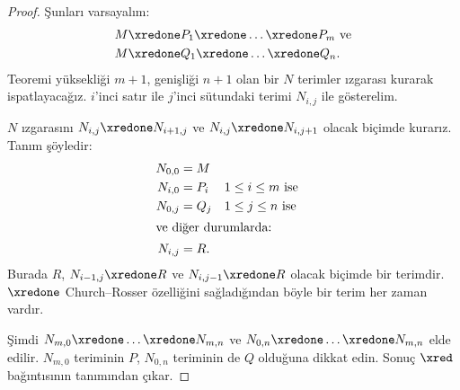 \begin{proof}
  Şunları varsayalım:
  \begin{align*}
    M & \xredone P_1 \xredone \dots \xredone P_m \text{ ve}\\
    M & \xredone Q_1 \xredone \dots \xredone Q_n.
  \end{align*}
  Teoremi yüksekliği $m+1$, genişliği $n+1$ olan bir $N$ terimler ızgarası
  kurarak ispatlayacağız. $i$'inci satır ile $j$'inci sütundaki terimi
  $N_{i,j}$ ile gösterelim.

  $N$ ızgarasını $N_{i,j}\xredone N_{i+1,j}$ ve
  $N_{i,j}\xredone N_{i,j+1}$ olacak biçimde kurarız. Tanım şöyledir:
  \begin{align*}
    N_{0,0} &= M \\
    N_{i,0} &= P_i && \text{$1\le i\le m$ ise} \\
    N_{0,j} &= Q_j && \text{$1\le j\le n$ ise} \\
  \intertext{ve diğer durumlarda:}
    N_{i,j} &= R.
  \end{align*}
  Burada $R$, $N_{i-1,j}\xredone R$ ve $N_{i,j-1}\xredone R$ olacak
  biçimde bir terimdir. $\xredone$ Church--Rosser özelliğini sağladığından
  böyle bir terim her zaman vardır.

  Şimdi $N_{m,0}\xredone\dots\xredone N_{m,n}$ ve
  $N_{0,n}\xredone\dots\xredone N_{m,n}$ elde edilir. $N_{m,0}$ teriminin
  $P$, $N_{0,n}$ teriminin de $Q$ olduğuna dikkat edin. Sonuç $\xred$
  bağıntısının tanımından çıkar.
\end{proof}

